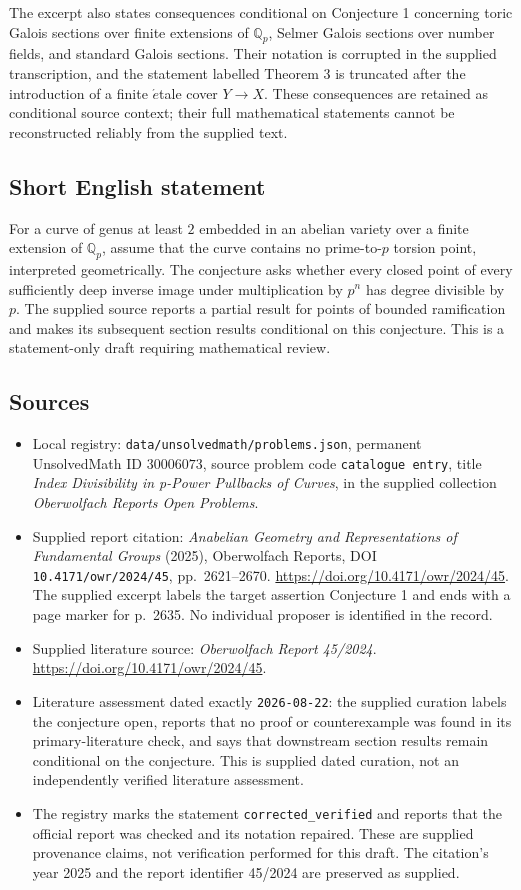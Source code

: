 \documentclass[11pt]{article}
\newcommand{\Q}{\mathbb{Q}}
\begin{document}
The excerpt also states consequences conditional on Conjecture 1 concerning toric Galois sections over finite extensions of \(\Q_p\), Selmer Galois sections over number fields, and standard Galois sections. Their notation is corrupted in the supplied transcription, and the statement labelled Theorem 3 is truncated after the introduction of a finite \(\acute{e}\)tale cover \(Y\to X\). These consequences are retained as conditional source context; their full mathematical statements cannot be reconstructed reliably from the supplied text.
\subsection{Short English statement}
For a curve of genus at least \(2\) embedded in an abelian variety over a finite extension of \(\Q_p\), assume that the curve contains no prime-to-\(p\) torsion point, interpreted geometrically. The conjecture asks whether every closed point of every sufficiently deep inverse image under multiplication by \(p^n\) has degree divisible by \(p\). The supplied source reports a partial result for points of bounded ramification and makes its subsequent section results conditional on this conjecture. This is a statement-only draft requiring mathematical review.
\subsection{Sources}
\begin{itemize}
\item Local registry: \texttt{data/unsolvedmath/problems.json}, permanent UnsolvedMath ID \(30006073\), source problem code \texttt{catalogue entry}, title \emph{Index Divisibility in p-Power Pullbacks of Curves}, in the supplied collection \emph{Oberwolfach Reports Open Problems}.
\item Supplied report citation: \emph{Anabelian Geometry and Representations of Fundamental Groups} (2025), Oberwolfach Reports, DOI \texttt{10.4171/owr/2024/45}, pp.\ 2621--2670. \url{https://doi.org/10.4171/owr/2024/45}. The supplied excerpt labels the target assertion Conjecture 1 and ends with a page marker for p.\ 2635. No individual proposer is identified in the record.
\item Supplied literature source: \emph{Oberwolfach Report 45/2024}. \url{https://doi.org/10.4171/owr/2024/45}.
\item Literature assessment dated exactly \texttt{2026-08-22}: the supplied curation labels the conjecture open, reports that no proof or counterexample was found in its primary-literature check, and says that downstream section results remain conditional on the conjecture. This is supplied dated curation, not an independently verified literature assessment.
\item The registry marks the statement \texttt{corrected\_verified} and reports that the official report was checked and its notation repaired. These are supplied provenance claims, not verification performed for this draft. The citation's year 2025 and the report identifier 45/2024 are preserved as supplied.
\end{itemize}
\end{document}
